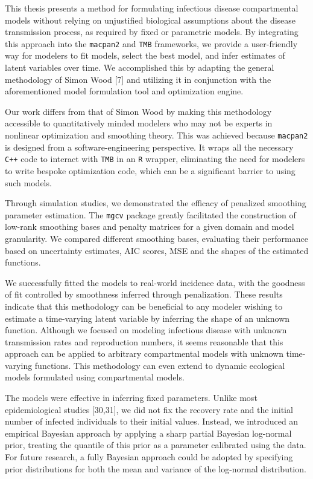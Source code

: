 \documentclass[
11pt, %
oneside, %
english, %
singlespacing, %
]{macthesis} %
\begin{document}
This thesis presents a method for formulating infectious disease compartmental models without relying on unjustified biological assumptions about the disease transmission process, as required by fixed or parametric models. By integrating this approach into the \texttt{macpan2} and \texttt{TMB} frameworks, we provide a user-friendly way for modelers to fit models, select the best model, and infer estimates of latent variables over time. We accomplished this by adapting the general methodology of Simon Wood {[}7{]} and utilizing it in conjunction with the aforementioned model formulation tool and optimization engine.

Our work differs from that of Simon Wood by making this methodology accessible to quantitatively minded modelers who may not be experts in nonlinear optimization and smoothing theory. This was achieved because \texttt{macpan2} is designed from a software-engineering perspective. It wraps all the necessary \texttt{C++} code to interact with \texttt{TMB} in an \texttt{R} wrapper, eliminating the need for modelers to write bespoke optimization code, which can be a significant barrier to using such models.

Through simulation studies, we demonstrated the efficacy of penalized smoothing parameter estimation. The \texttt{mgcv} package greatly facilitated the construction of low-rank smoothing bases and penalty matrices for a given domain and model granularity. We compared different smoothing bases, evaluating their performance based on uncertainty estimates, AIC scores, MSE and the shapes of the estimated functions.

We successfully fitted the models to real-world incidence data, with the goodness of fit controlled by smoothness inferred through penalization. These results indicate that this methodology can be beneficial to any modeler wishing to estimate a time-varying latent variable by inferring the shape of an unknown function. Although we focused on modeling infectious disease with unknown transmission rates and reproduction numbers, it seems reasonable that this approach can be applied to arbitrary compartmental models with unknown time-varying functions. This methodology can even extend to dynamic ecological models formulated using compartmental models.

The models were effective in inferring fixed parameters. Unlike most epidemiological studies {[}30,31{]}, we did not fix the recovery rate and the initial number of infected individuals to their initial values. Instead, we introduced an empirical Bayesian approach by applying a sharp partial Bayesian log-normal prior, treating the quantile of this prior as a parameter calibrated using the data. For future research, a fully Bayesian approach could be adopted by specifying prior distributions for both the mean and variance of the log-normal distribution.
\end{document}
